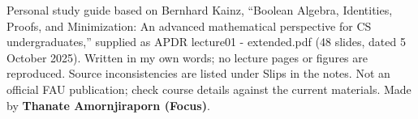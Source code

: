 \documentclass[11pt]{article}
\begin{document}
\vfill{\small Personal study guide based on Bernhard Kainz, “Boolean Algebra, Identities, Proofs, and Minimization: An advanced mathematical perspective for CS undergraduates,” supplied as APDR lecture01 - extended.pdf (48 slides, dated 5 October 2025). Written in my own words; no lecture pages or figures are reproduced. Source inconsistencies are listed under Slips in the notes. Not an official FAU publication; check course details against the current materials. Made by \textbf{Thanate Amornjiraporn (Focus)}.}
\end{document}
